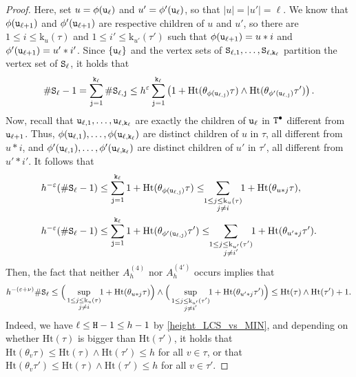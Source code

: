 \documentclass[11pt,reqno]{amsart}
\newcommand{\Ht}{\mathrm{Ht}}
\newcommand{\rk}{\mathrm{k}}
\newcommand{\eps}{\varepsilon}
\begin{document}
\begin{proof}
Here, set $u=\phi(\mathtt{u}_\ell)$ and $u'=\phi'(\mathtt{u}_\ell)$, so that $|u|=|u'|=\ell$. We know that $\phi(\mathtt{u}_{\ell+1})$ and $\phi'(\mathtt{u}_{\ell+1})$ are respective children of $u$ and $u'$, so there are $1\leq i\leq \rk_u(\tau)$ and $1\leq i'\leq \rk_{u'}(\tau')$ such that $\phi(\mathtt{u}_{\ell+1})=u*i$ and $\phi'(\mathtt{u}_{\ell+1})=u'*i'$. Since $\{\mathtt{u}_\ell\}$ and the vertex sets of $\mathtt{S}_{\ell,1},\ldots,\mathtt{S}_{\ell,\mathtt{k}_\ell}$ partition the vertex set of $\mathtt{S}_\ell$, it holds that
\[\#\ttS_{\ell}-1=\sum_{\ttj=1}^{\ttk_\ell}\# \ttS_{\ell,\ttj}\leq h^\varepsilon\sum_{\ttj=1}^{\ttk_\ell}\left(1+\Ht(\theta_{\phi(\ttu_{\ell,\ttj})}\tau)\wedge \Ht(\theta_{\phi'(\ttu_{\ell,\ttj})}\tau') \right).\]
Now, recall that $\mathtt{u}_{\ell,1},\ldots,\mathtt{u}_{\ell,\mathtt{k}_\ell}$ are exactly the children of $\mathtt{u}_\ell$ in $\mathtt{T}^\bullet$ different from $\mathtt{u}_{\ell+1}$. Thus, $\phi(\mathtt{u}_{\ell,1}),\ldots,\phi(\mathtt{u}_{\ell,\mathtt{k}_\ell})$ are distinct children of $u$ in $\tau$, all different from $u*i$, and $\phi'(\mathtt{u}_{\ell,1}),\ldots,\phi'(\mathtt{u}_{\ell,\mathtt{k}_\ell})$ are distinct children of $u'$ in $\tau'$, all different from $u'*i'$. It follows that
\begin{align*}
h^{-\varepsilon}(\#\ttS_\ell-1)&\leq \sum_{\ttj=1}^{\ttk_\ell}1+\Ht(\theta_{\phi(\ttu_{\ell,\ttj})}\tau)\leq  \!\!\sum_{\substack{1\leq j\leq \rk_u(\tau)\\ j\neq i}}\!\! 1+\Ht(\theta_{u*j}\tau),\\
h^{-\varepsilon}(\#\ttS_\ell-1)&\leq \sum_{\ttj=1}^{\ttk_\ell}1+\Ht(\theta_{\phi'(\ttu_{\ell,\ttj})}\tau')\leq  \!\!\sum_{\substack{1\leq j\leq \rk_{u'}(\tau')\\ j\neq i'}}\!\! 1+\Ht(\theta_{u'*j}\tau').
\end{align*}
Then, the fact that neither $A_h^{(4)}$ nor $A_h^{(4')}$ occurs implies that
\[h^{-(\eps+\nu)}\#\ttS_\ell \leq  \Big(\sup_{\substack{1\leq j\leq \rk_u(\tau) \\ j\neq i}}\!\! 1+\Ht(\theta_{u*j}\tau)\Big)\wedge \Big(\sup_{\substack{1\leq j\leq \rk_{u'}(\tau') \\ j\neq i'}}\!\! 1+\Ht(\theta_{u'*j}\tau') \Big)\leq  \Ht(\tau)\wedge\Ht(\tau')+1.\]
Indeed, we have $\ell\leq \mathtt{H}-1\leq h-1$ by \eqref{height_LCS_vs_MIN}, and depending on whether $\Ht(\tau)$ is bigger than $\Ht(\tau')$, it holds that $\Ht(\theta_v\tau)\leq \Ht(\tau)\wedge \Ht(\tau')\leq h$ for all $v\in\tau$, or that $\Ht(\theta_v\tau')\leq \Ht(\tau)\wedge \Ht(\tau')\leq h$ for all $v\in\tau'$.
\end{proof}
\end{document}

